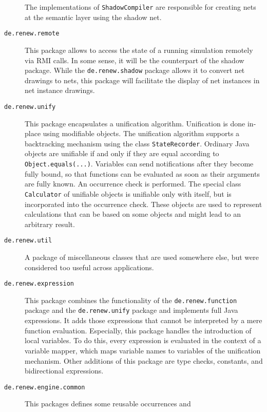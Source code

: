 \begin{description}
  The implementations of \texttt{ShadowCompiler} are responsible for
  creating nets at the semantic layer using the shadow net.
\item[\texttt{de.renew.remote}] 
  This package allows to access the state of a running simulation
  remotely via RMI calls. In some sense, it will be
  the counterpart of the shadow package. While the \texttt{de.renew.shadow} 
  package allows it to convert net drawings to nets, this
  package will facilitate the display of net instances in net instance
  drawings.
\item[\texttt{de.renew.unify}] 
  This package encapsulates a unification algorithm.
  Unification is done in-place using modifiable objects.
  The unification algorithm supports a backtracking mechanism
  using the class \texttt{StateRecorder}.
  Ordinary Java objects are unifiable
  if and only if they are equal according to \texttt{Object.equals(...)}.
  Variables can send notifications after they become fully bound,
  so that functions can be evaluated as soon as their arguments
  are fully known. An occurrence check is performed.
  The special class \texttt{Calculator} of
  unifiable objects is unifiable only with itself, but is
  incorporated into the occurrence check. These objects are 
  used to represent calculations that can be based on some objects
  and might lead to an arbitrary result.
\item[\texttt{de.renew.util}] 
  A package of miscellaneous classes that are used somewhere else,
  but were considered too useful across applications.
\item[\texttt{de.renew.expression}] 
  This package combines the functionality of
  the \texttt{de.renew.function} package and
  the \texttt{de.renew.unify} package and implements
  full Java expressions. It adds those expressions
  that cannot be interpreted by a mere function evaluation.
  Especially, this package handles the introduction of local variables.
  To do this, every expression is evaluated in the context of a
  variable mapper, which maps variable names to variables of the
  unification mechanism. Other additions of this package are
  type checks, constants, and bidirectional expressions.
\item[\texttt{de.renew.engine.common}] 
  This packages defines some reusable occurrences and

\end{description}

